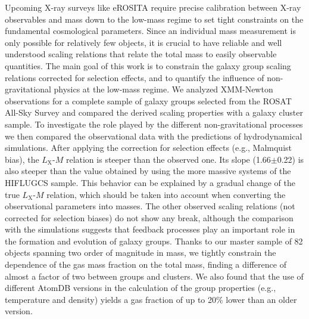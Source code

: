 \documentclass{aa} %
\begin{document}
  \abstract
  {Upcoming X-ray surveys like eROSITA require precise calibration between X-ray observables and mass down to the low-mass regime to set tight constraints on the
    fundamental cosmological parameters. Since an individual mass measurement is only possible for relatively few objects, it is crucial to have reliable and well understood scaling relations that relate the total mass to easily
    observable quantities.}
  {The main goal of this work is to constrain the galaxy group scaling relations corrected for selection effects, and to quantify the influence of non-gravitational
physics at the low-mass regime.}
  {We analyzed XMM-Newton observations for a complete sample of galaxy groups selected from the ROSAT All-Sky Survey and compared the derived scaling properties with a galaxy cluster sample. To investigate the role played by the different
    non-gravitational processes we then compared the observational
    data with the predictions of hydrodynamical simulations.}
  { After applying the correction for selection effects (e.g., Malmquist bias), the $L_\text{X}$-$M$ relation is steeper than the observed one. Its slope (1.66$\pm$0.22) is also steeper than the value obtained by using the more massive systems of the HIFLUGCS sample. This behavior can be explained by a gradual change of the true $L_\text{X}$-$M$ relation, which should be taken into account when converting the observational parameters into masses. The other observed scaling relations (not corrected for selection biases) do not show any break, although the comparison with the simulations suggests that feedback processes play an important role in the formation and evolution of galaxy groups. Thanks to our master sample of 82 objects spanning two order of magnitude in mass, we tightly constrain the dependence of the gas mass fraction on the total mass, finding a difference of almost a factor of two between groups and clusters. We also found that the use of different AtomDB versions in the calculation of the group properties (e.g., temperature and density) yields a gas fraction of up to 20$\%$ lower than an older version. 
}
   {}


\maketitle
\end{document}
